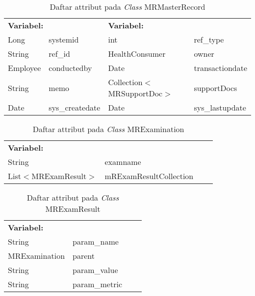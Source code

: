 \begin{table}[H]
	\caption{Daftar attribut pada \textit{Class} MRMasterRecord}
	\centering
	\small
	\begin{adjustbox}{width=1\textwidth}	
		\begin{tabular}{|p{2cm} p{2.1cm} p{5cm} p{3.1cm}|}
			\hline
			\multicolumn{2}{|l}{\textbf{Variabel:}}&\multicolumn{2}{l|}{\textbf{\textbf{Variabel:}}}\\
			Long&systemid&int&ref\_type\\
			String&ref\_id&HealthConsumer&owner\\
			Employee&conductedby&Date&transactiondate\\
			String&memo&Collection$<$MRSupportDoc$>$&supportDocs\\
			Date&sys\_createdate&Date&sys\_lastupdate\\
			\hline
		\end{tabular}
	\end{adjustbox}
\end{table}
\begin{table}[H]
	\caption{Daftar attribut pada \textit{Class} MRExamination}
	\centering
	\small
	\begin{adjustbox}{width=1\textwidth}	
		\begin{tabular}{|p{4cm} p{2.1cm} p{3cm} p{3.1cm}|}
			\hline
			\multicolumn{2}{|l}{\textbf{Variabel:}}&\multicolumn{2}{l|}{\textbf{}}\\
			String&examname&&\\
			List$<$MRExamResult$>$&mRExamResultCollection&&\\
			\hline
		\end{tabular}
	\end{adjustbox}
\end{table}
\begin{table}[H]
	\caption{Daftar attribut pada \textit{Class} MRExamResult}
	\centering
	\small
	\begin{adjustbox}{width=1\textwidth}	
		\begin{tabular}{|p{4cm} p{2.1cm} p{3cm} p{3.1cm}|}
			\hline
			\multicolumn{2}{|l}{\textbf{Variabel:}}&\multicolumn{2}{l|}{\textbf{}}\\
			String&param\_name&&\\
			MRExamination&parent&&\\
			String&param\_value&&\\
			String&param\_metric&&\\
			\hline
		\end{tabular}
	\end{adjustbox}
\end{table}
